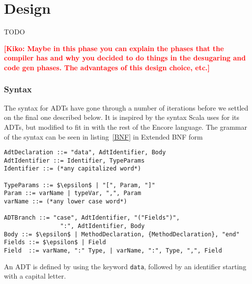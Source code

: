 \documentclass[10pt]{report}
\newcommand{\KIKO}[1]{\textcolor{red}{\textbf{[Kiko: #1]}}}
\def\code#1{\texttt{#1}} %
\begin{document}
{\chapter{Design}
TODO

\KIKO{Maybe in this phase you can explain the phases that the compiler has and
  why you decided to do things in the desugaring and code gen phases. The advantages
of this design choice, etc.}

\subsection{Syntax}
\par{The syntax for ADTs have gone through a number of iterations before we settled on the final one described below.  It is inspired by the syntax Scala uses for its ADTs, but modified to fit in with the rest of the Encore language. The grammar of the syntax can be seen in listing~\ref{BNF} in Extended BNF form\cite{eBNF}}%

\begin{lstlisting}[language=Encore,caption={Grammar for the suggested syntax},label=BNF,mathescape=true]
AdtDeclaration ::= "data", AdtIdentifier, Body
AdtIdentifier ::= Identifier, TypeParams
Identifier ::= (*any capitalized word*)

TypeParams ::= $\epsilon$ | "[", Param, "]"
Param ::= varName | typeVar, ",", Param
varName ::= (*any lower case word*)

ADTBranch ::= "case", AdtIdentifier, "("Fields")",
                ":", AdtIdentifier, Body
Body ::= $\epsilon$ | MethodDeclaration, {MethodDeclaration}, "end"
Fields ::= $\epsilon$ | Field
Field  ::= varName, ":" Type, | varName, ":", Type, ",", Field
\end{lstlisting}

\par{An ADT is defined by using the keyword \code{data}, followed by an identifier starting with a capital letter.}

}
\end{document}
